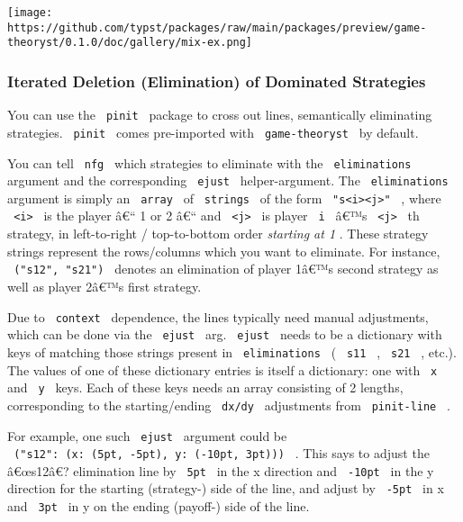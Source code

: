\texttt{[image: https://github.com/typst/packages/raw/main/packages/preview/game-theoryst/0.1.0/doc/gallery/mix-ex.png]}

\subsubsection{Iterated Deletion (Elimination) of Dominated
Strategies}\label{iterated-deletion-elimination-of-dominated-strategies}

You can use the \texttt{\ pinit\ } package to cross out lines,
semantically eliminating strategies. \texttt{\ pinit\ } comes
pre-imported with \texttt{\ game-theoryst\ } by default.

You can tell \texttt{\ nfg\ } which strategies to eliminate with the
\texttt{\ eliminations\ } argument and the corresponding
\texttt{\ ejust\ } helper-argument. The \texttt{\ eliminations\ }
argument is simply an \texttt{\ array\ } of \texttt{\ strings\ } of the
form
\texttt{\ "s\textless{}i\textgreater{}\textless{}j\textgreater{}"\ } ,
where \texttt{\ \textless{}i\textgreater{}\ } is the player â€`` 1 or 2
â€`` and \texttt{\ \textless{}j\textgreater{}\ } is player
\texttt{\ i\ } â€™s \texttt{\ \textless{}j\textgreater{}\ } th strategy,
in left-to-right / top-to-bottom order \emph{starting at 1} . These
strategy strings represent the rows/columns which you want to eliminate.
For instance, \texttt{\ ("s12",\ "s21")\ } denotes an elimination of
player 1â€™s second strategy as well as player 2â€™s first strategy.

Due to \texttt{\ context\ } dependence, the lines typically need manual
adjustments, which can be done via the \texttt{\ ejust\ } arg.
\texttt{\ ejust\ } needs to be a dictionary with keys of matching those
strings present in \texttt{\ eliminations\ } ( \texttt{\ s11\ } ,
\texttt{\ s21\ } , etc.). The values of one of these dictionary entries
is itself a dictionary: one with \texttt{\ x\ } and \texttt{\ y\ } keys.
Each of these keys needs an array consisting of 2 lengths, corresponding
to the starting/ending \texttt{\ dx/dy\ } adjustments from
\texttt{\ pinit-line\ } .

For example, one such \texttt{\ ejust\ } argument could be
\texttt{\ ("s12":\ (x:\ (5pt,\ -5pt),\ y:\ (-10pt,\ 3pt)))\ } . This
says to adjust the â€œs12â€? elimination line by \texttt{\ 5pt\ } in the
x direction and \texttt{\ -10pt\ } in the y direction for the starting
(strategy-) side of the line, and adjust by \texttt{\ -5pt\ } in x and
\texttt{\ 3pt\ } in y on the ending (payoff-) side of the line.

